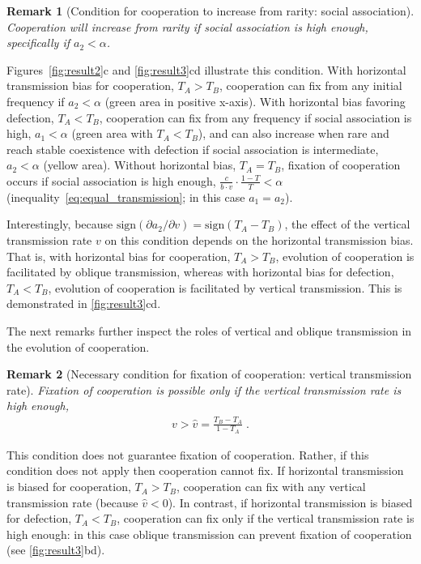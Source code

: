 \documentclass[12pt]{extarticle}
\newtheorem{remark}{Remark}
\begin{document}
\begin{remark}[Condition for cooperation to increase from rarity: social association]
\label{remark:intermediate_association_res3}
Cooperation will increase from rarity if social association is high enough, specifically if $a_2 < \alpha$.
\end{remark}
Figures~\ref{fig:result2}c and \ref{fig:result3}cd illustrate this condition.
With horizontal transmission bias for cooperation, $T_A>T_B$, cooperation can fix from any initial frequency if $a_2<\alpha$ (green area in positive x-axis). 
With horizontal bias favoring defection, $T_A<T_B$, cooperation can fix from any frequency if social association is high, $a_1<\alpha$ (green area with $T_A<T_B$), and can also increase when rare and reach stable coexistence with defection if social association is intermediate, $a_2<\alpha$ (yellow area).
Without horizontal bias, $T_A=T_B$, fixation of cooperation occurs if social association is high enough, $\frac{c}{b \cdot v} \cdot \frac{1-T}{T} < \alpha$ (inequality~\ref{eq:equal_transmission}; in this case $a_1=a_2$).

Interestingly, because $\text{sign} (\partial a_2 / \partial v) = \text{sign} (T_A-T_B)$, the effect of the vertical transmission rate $v$ on this condition depends on the horizontal transmission bias. 
That is, with horizontal bias for cooperation, $T_A>T_B$, evolution of cooperation is facilitated by oblique transmission, whereas with horizontal bias for defection, $T_A<T_B$, evolution of cooperation is facilitated by vertical transmission.
This is demonstrated in \autoref{fig:result3}cd.

The next remarks further inspect the roles of vertical and oblique transmission in the evolution of cooperation.
\\

\begin{remark}[Necessary condition for fixation of cooperation: vertical transmission rate]
\label{remark:vhat}
  Fixation of cooperation is possible only if the vertical transmission rate is high enough,
  \begin{equation} \label{eq:fixation_of_cooperation_vertical_transmission_condition}
    \begin{aligned}
      v>\hat{v} = \frac{T_B - T_A}{1-T_A} \;.
    \end{aligned}
    \end{equation} 
\end{remark}
This condition does not guarantee fixation of cooperation. Rather, if this condition does not apply then cooperation cannot fix.
If horizontal transmission is biased for cooperation, $T_A>T_B$, cooperation can fix with any vertical transmission rate (because $\hat{v}<0$).
In contrast, if horizontal transmission is biased for defection, $T_A<T_B$,  cooperation can fix only if the vertical transmission rate is high enough: in this case oblique transmission can prevent fixation of cooperation (see \autoref{fig:result3}bd).
\end{document}
